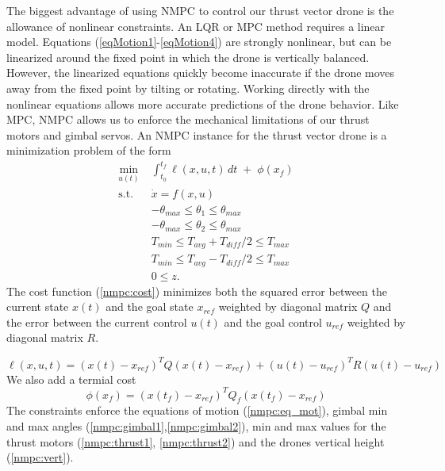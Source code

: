 \documentclass[]{article}
\newcommand{\mpc}{MPC}
\newcommand{\nmpc}{NMPC}
\begin{document}
The biggest advantage of using {\nmpc} to control our thrust vector drone is the allowance of nonlinear constraints. An LQR or {\mpc} method  requires a linear model.
 Equations (\ref{eqMotion1}-\ref{eqMotion4}) are strongly nonlinear, but can be linearized around the fixed point in which the drone is vertically balanced.  However, the linearized equations quickly become inaccurate if the drone moves away from the fixed point by tilting or rotating.  Working directly with the nonlinear equations allows more accurate predictions of the drone behavior. Like {\mpc}, {\nmpc}  allows us to enforce the mechanical limitations of our thrust motors and gimbal servos. An {\nmpc} instance for the thrust vector drone is a minimization problem of the form
\begin{align}
	   \min_{u(t)} \; & \int_{t_0}^{t_f} \ell(x,u,t)\,dt \;+\; \phi(x_f) \label{nmpc:cost} \\
	  	  \text{s.t.} \;\; & \dot{x} = f(x,u)  \label{nmpc:eq_mot} \\
	  &	-\theta_{max} \leq \theta_1 \leq \theta_{max} \label{nmpc:gimbal1} \\
	  & 	-\theta_{max} \leq \theta_2 \leq \theta_{max} \label{nmpc:gimbal2} \\
	  & 	T_{min}  \leq T_{avg} + T_{diff}/2 \leq T_{max} \label{nmpc:thrust1} \\
	  &    T_{min} \leq  T_{avg} - T_{diff}/2 \leq T_{max} \label{nmpc:thrust2} \\
	  &        0 \leq z. \label{nmpc:vert}
\end{align}
The cost function (\ref{nmpc:cost}) minimizes both  the squared error between the current state $x(t)$ and the goal state $x_{ref}$ weighted by diagonal matrix $Q$ and the error between the current control $u(t)$ and the goal control $u_{ref}$ weighted by diagonal matrix $R$. 
        
        \begin{equation}
        		\ell(x,u,t) = (x(t)-x_{ref})^T Q (x(t)-x_{ref}) + (u(t)-u_{ref})^T R (u(t)-u_{ref}) 
        \end{equation}
We also add a termial cost 
        \begin{equation}
        	\phi(x_f) = (x(t_f)-x_{ref})^T Q_f (x(t_f)-x_{ref})
        \end{equation}
The constraints enforce the equations of motion (\ref{nmpc:eq_mot}), gimbal min and max angles (\ref{nmpc:gimbal1},\ref{nmpc:gimbal2}), min and max values for the thrust motors (\ref{nmpc:thrust1}, \ref{nmpc:thrust2}) and the drones vertical height (\ref{nmpc:vert}).
\end{document}
